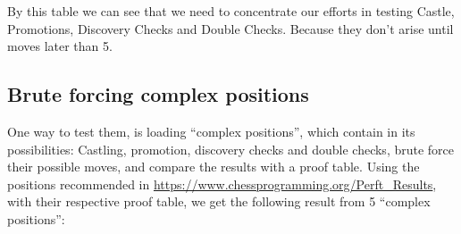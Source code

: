 \documentclass[10pt]{article}
\begin{document}
By this table we can see that we need to concentrate our efforts in testing
Castle, Promotions, Discovery Checks and Double Checks. Because they don't arise
until moves later than 5.

\subsection{Brute forcing complex positions}


One way to test them, is loading ``complex positions'', which contain in its
possibilities: Castling, promotion, discovery checks and double checks, brute
force their
possible moves, and compare the results with a proof table. Using the
positions recommended in \url{https://www.chessprogramming.org/Perft_Results},
with their respective proof table,
we get the following result from 5 ``complex positions'':
\end{document}
